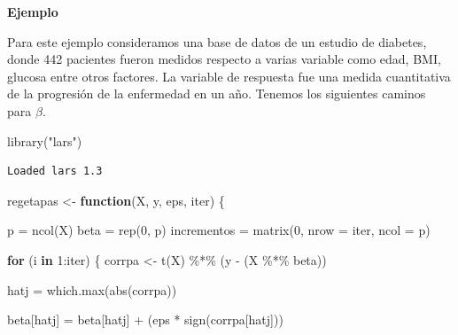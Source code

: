 \documentclass[
  letterpaper,
  DIV=11,
  numbers=noendperiod]{scrreprt}
\newenvironment{Shaded}{\begin{snugshade}}{\end{snugshade}}
\newcommand{\AttributeTok}[1]{\textcolor[rgb]{0.40,0.45,0.13}{#1}}
\newcommand{\ControlFlowTok}[1]{\textcolor[rgb]{0.00,0.23,0.31}{\textbf{#1}}}
\newcommand{\DecValTok}[1]{\textcolor[rgb]{0.68,0.00,0.00}{#1}}
\newcommand{\FunctionTok}[1]{\textcolor[rgb]{0.28,0.35,0.67}{#1}}
\newcommand{\NormalTok}[1]{\textcolor[rgb]{0.00,0.23,0.31}{#1}}
\newcommand{\OtherTok}[1]{\textcolor[rgb]{0.00,0.23,0.31}{#1}}
\newcommand{\SpecialCharTok}[1]{\textcolor[rgb]{0.37,0.37,0.37}{#1}}
\newcommand{\StringTok}[1]{\textcolor[rgb]{0.13,0.47,0.30}{#1}}
\theoremstyle{plain}
\theoremstyle{definition}
\theoremstyle{remark}
\begin{document}
\begin{tcolorbox}[enhanced jigsaw, colframe=quarto-callout-note-color-frame, rightrule=.15mm, opacityback=0, toprule=.15mm, arc=.35mm, bottomrule=.15mm, colback=white, leftrule=.75mm, breakable, left=2mm]

\vspace{-3mm}\textbf{Ejemplo}\vspace{3mm}

Para este ejemplo consideramos una base de datos de un estudio de
diabetes, donde 442 pacientes fueron medidos respecto a varias variable
como edad, BMI, glucosa entre otros factores. La variable de respuesta
fue una medida cuantitativa de la progresión de la enfermedad en un año.
Tenemos los siguientes caminos para \(\beta\).

\begin{Shaded}
\begin{Highlighting}[]
\FunctionTok{library}\NormalTok{(}\StringTok{"lars"}\NormalTok{)}
\end{Highlighting}
\end{Shaded}

\begin{verbatim}
Loaded lars 1.3
\end{verbatim}

\begin{Shaded}
\begin{Highlighting}[]
\NormalTok{regetapas }\OtherTok{\textless{}{-}} \ControlFlowTok{function}\NormalTok{(X, y, eps, iter) \{}
  
\NormalTok{  p }\OtherTok{=} \FunctionTok{ncol}\NormalTok{(X)              }
\NormalTok{  beta }\OtherTok{=} \FunctionTok{rep}\NormalTok{(}\DecValTok{0}\NormalTok{, p)          }
\NormalTok{  incrementos }\OtherTok{=} \FunctionTok{matrix}\NormalTok{(}\DecValTok{0}\NormalTok{, }\AttributeTok{nrow =}\NormalTok{ iter, }\AttributeTok{ncol =}\NormalTok{ p)}
  
  \ControlFlowTok{for}\NormalTok{ (i }\ControlFlowTok{in} \DecValTok{1}\SpecialCharTok{:}\NormalTok{iter) \{}
\NormalTok{    corrpa }\OtherTok{\textless{}{-}} \FunctionTok{t}\NormalTok{(X) }\SpecialCharTok{\%*\%}\NormalTok{ (y }\SpecialCharTok{{-}}\NormalTok{ (X }\SpecialCharTok{\%*\%}\NormalTok{ beta))}
    
\NormalTok{    hatj }\OtherTok{=} \FunctionTok{which.max}\NormalTok{(}\FunctionTok{abs}\NormalTok{(corrpa))}
    
    
\NormalTok{    beta[hatj] }\OtherTok{=}\NormalTok{ beta[hatj] }\SpecialCharTok{+}\NormalTok{ (eps }\SpecialCharTok{*} \FunctionTok{sign}\NormalTok{(corrpa[hatj]))}


\end{Highlighting}
\end{Shaded}
\end{tcolorbox}
\end{document}
